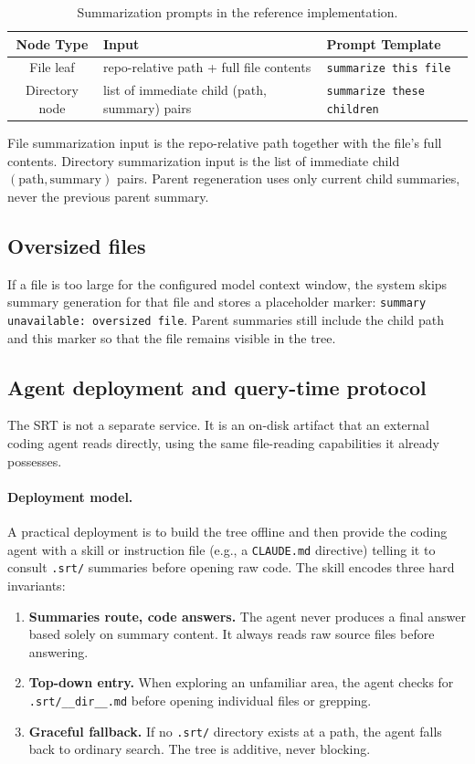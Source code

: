 \documentclass[11pt,a4paper]{article}
\newcommand{\srt}{\textsc{SRT}}
\begin{document}
\begin{table}[h]
\centering
\caption{Summarization prompts in the reference implementation.}\label{tab:prompts}
\footnotesize
\begin{tabularx}{\textwidth}{clX}
\toprule
\textbf{Node Type} & \textbf{Input} & \textbf{Prompt Template} \\
\midrule
File leaf & repo-relative path + full file contents & \texttt{summarize this file} \\
\addlinespace
Directory node & list of immediate child (path, summary) pairs & \texttt{summarize these children} \\
\bottomrule
\end{tabularx}
\end{table}

File summarization input is the repo-relative path together with the file's full contents. Directory summarization input is the list of immediate child \((\text{path}, \text{summary})\) pairs. Parent regeneration uses only current child summaries, never the previous parent summary.

\subsection{Oversized files}
If a file is too large for the configured model context window, the system skips summary generation for that file and stores a placeholder marker: \texttt{summary unavailable: oversized file}. Parent summaries still include the child path and this marker so that the file remains visible in the tree.

\subsection{Agent deployment and query-time protocol}\label{app:agent}

The \srt{} is not a separate service.
It is an on-disk artifact that an external coding agent reads directly, using the same file-reading capabilities it already possesses.

\paragraph{Deployment model.}
A practical deployment is to build the tree offline and then provide the coding agent with a skill or instruction file (e.g., a \texttt{CLAUDE.md} directive) telling it to consult \texttt{.srt/} summaries before opening raw code.
The skill encodes three hard invariants:
\begin{enumerate}[nosep]
    \item \textbf{Summaries route, code answers.} The agent never produces a final answer based solely on summary content. It always reads raw source files before answering.
    \item \textbf{Top-down entry.} When exploring an unfamiliar area, the agent checks for \texttt{.srt/\_\_dir\_\_.md} before opening individual files or grepping.
    \item \textbf{Graceful fallback.} If no \texttt{.srt/} directory exists at a path, the agent falls back to ordinary search. The tree is additive, never blocking.
\end{enumerate}
\end{document}
